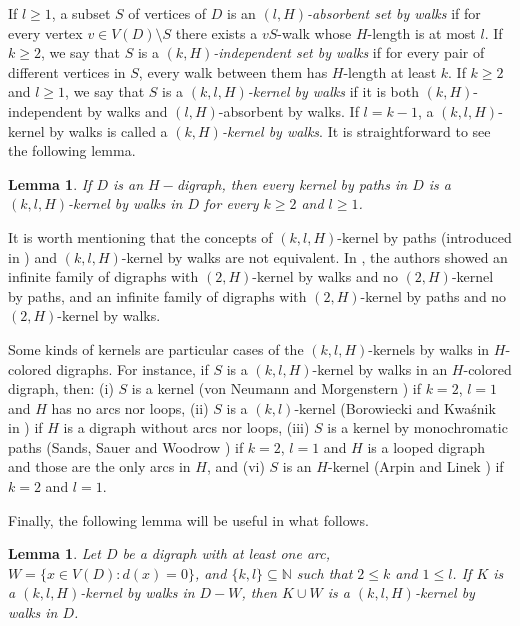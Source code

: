 \documentclass[10pt,a4paper]{article}
\newtheorem{lemma}[theorem]{Lemma}
\begin{document}
If $l \geq 1$, a subset $S$ of vertices of $D$ is an \textit{$(l, H)$-absorbent set by walks} if for every vertex $v \in V(D) \setminus S$ there exists a $vS$-walk whose $H$-length is at most $l$. If $k \geq 2$, we say that $S$ is a \textit{$(k,H)$-independent set by walks} if for every pair of different vertices in $S$, every walk between them has $H$-length at least $k$.
If $k\geq 2$ and $l\geq 1$, we say that $S$ is a \textit{$(k, l,H)$-kernel by walks} if it is both $(k,H)$-independent by walks and $(l,H)$-absorbent by walks. If $l=k-1$, a $(k,l,H)$-kernel by walks is called a \textit{$(k, H)$-kernel by walks}. It is straightforward to see the following lemma.

 \begin{lemma}
\label{hdigraph}
If $D$ is an $H-$digraph, then every kernel by paths in $D$ is a $(k,l,H)$-kernel by walks in $D$ for every $k \geq 2$ and $l \geq 1$.
\end{lemma}

It is worth mentioning that the concepts of $(k,l,H)$-kernel by paths (introduced in \cite{nearly}) and $(k,l,H)$-kernel by walks are not equivalent. In \cite{ger}, the authors showed an infinite family of digraphs with $(2,H)$-kernel by walks and no $(2,H)$-kernel by paths, and an infinite family of digraphs with $(2,H)$-kernel by paths and no $(2,H)$-kernel by walks.

Some kinds of kernels are particular cases of the $(k,l,H)$-kernels by walks in $H$-colored digraphs. For instance, if $S$ is a $(k,l,H)$-kernel by walks in an $H$-colored digraph, then: 
(i) $S$ is a kernel (von Neumann and Morgenstern \cite{2}) if $k=2$, $l=1$ and $H$ has no arcs nor loops,
(ii) $S$ is a $(k,l)$-kernel (Borowiecki and Kwa\'snik in \cite{14}) if
$H$ is a digraph without arcs nor loops, 
(iii) $S$ is a kernel by monochromatic paths (Sands, Sauer and Woodrow \cite{9}) if  $k=2$, $l=1$ and $H$ is a looped digraph and those are the only arcs in $H$, and 
(vi) $S$ is an $H$-kernel  (Arpin and Linek \cite{7}) if $k=2$ and $l=1$.

Finally, the following lemma will be useful in what follows.

\begin{lemma}
\label{noisolatedvertices}
Let $D$ be a digraph with at least one arc, $W=\{ x \in V(D): d(x)=0\}$, and $\{ k, l \} \subseteq \mathbb{N}$ such that $2\leq k$ and $1\leq l$. If $K$ is a $(k,l, H)$-kernel by walks in $D - W$, then $K \cup W$ is a $(k,l,H)$-kernel by walks in $D$.
\end{lemma}
 
\end{document}
